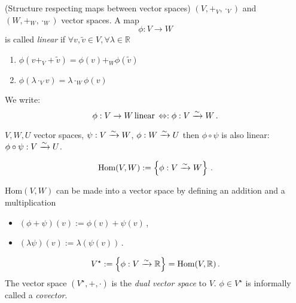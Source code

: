 \documentclass[11pt, a4paper, twocolumn]{article} %
\begin{document}
\begin{defn}
    (Structure respecting maps between vector spaces)\newline
    $(V, +_V, \cdot_V)$ and $(W, +_W, \cdot_W)$ vector spaces.
    A map
    \begin{equation}
        \phi: V \to W
    \end{equation}
    is called \textit{linear} if $\forall v, \tilde{v} \in V, \forall \lambda \in \mathbb{R}$
    \begin{enumerate}
        \item $\phi(v +_V + \tilde{v}) = \phi(v) +_W \phi(\tilde{v})$
        \item $\phi(\lambda\cdot_V v) = \lambda \cdot_W \phi(v)$
    \end{enumerate}
    We write:
    \begin{equation}
        \phi: V \to W\, \text{linear}\, \Leftrightarrow: \phi: V \xrightarrow[]{\sim} W\,.
    \end{equation}
\end{defn}

\begin{theorem}
    $V, W, U$ vector spaces, $\psi: V\xrightarrow[]{\sim} W$, $\phi: W\xrightarrow[]{\sim} U$
    then $\phi \circ \psi$ is also linear: $\phi\circ\psi: V \xrightarrow[]{\sim} U$.
\end{theorem}

\begin{defn}
    \begin{equation}
        \text{Hom}(V,W):= \left\{ \phi: V\xrightarrow[]{\sim} W \right\}\,.
    \end{equation}
\end{defn}
\begin{note}
    Hom$(V,W)$ can be made into a vector space by defining an addition and a multiplication
    \begin{itemize}
        \item $(\phi + \psi)(v) := \phi(v) + \psi(v)$\,,
        \item $(\lambda \psi)(v) := \lambda (\psi(v))$\,.
    \end{itemize}
\end{note}

\begin{defn}
    \begin{equation}
        V^\star := \left\{ \phi: V \xrightarrow[]{\sim} \mathbb{R} \right\} = \text{Hom}(V, \mathbb{R})\,.
    \end{equation}
    The vector space $(V^\star, +, \cdot)$ is the \textit{dual vector space} to $V$.
    $\phi \in V^\star$ is informally called a \textit{covector}.
\end{defn}
\end{document}
